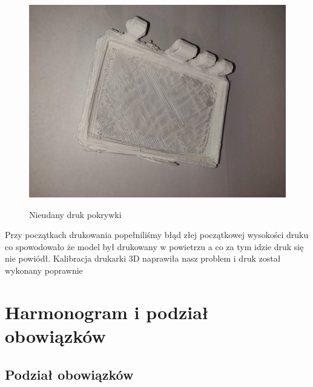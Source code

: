 \documentclass[12pt]{article}
\begin{document}
\begin{figure}[!h]
	\begin{center}
		{\includegraphics[width=12cm]{obudowa_broken.jpg}}
	\end{center}
	\caption{Nieudany druk pokrywki}
\end{figure}

Przy początkach drukowania popełniliśmy błąd złej początkowej wysokości druku co spowodowało że model był drukowany w powietrzu a co za tym idzie druk się nie powiódł. Kalibracja drukarki 3D naprawiła nasz problem i druk został wykonany poprawnie



\section{Harmonogram i podział obowiązków}

\subsection{Podział obowiązków}
\end{document}
